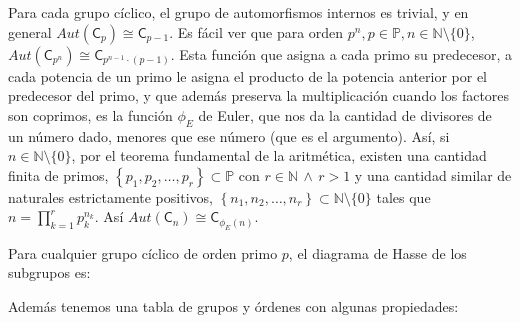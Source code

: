 \documentclass[12pt,a4paper,fleqn,spanish,final,openright]{extbook}
\theoremstyle{definition}
\theoremstyle{remark}
\begin{document}
Para cada grupo cíclico, el grupo de automorfismos internos es trivial, 
y en general $Aut(\mathsf{C}_p)   \cong    \mathsf{C}_{p-1}$. Es fácil ver que 
para orden $p^n , p   \in \mathds{P} , n   \in \mathds{N}\setminus\{0\}$, 
$Aut(\mathsf{C}_{p^n})   \cong    \mathsf{C}_{p^{n-1}    \cdot (p-1)}$. 
Esta función que asigna a cada primo su predecesor, a cada potencia de un primo 
le asigna el producto de la potencia anterior por el predecesor del primo, y que 
además preserva la multiplicación cuando los factores son coprimos, es la función 
$\phi_{E}$ de Euler, que nos da la cantidad de divisores de un número dado, 
menores que ese número (que es el argumento). Así, si 
$n \in \mathds{N}\setminus\{0\}$, por el teorema fundamental de la aritmética, 
existen una cantidad finita de primos, 
$\left\lbrace p_1 , p_2 , \ldots , p_r \right\rbrace    \subset \mathds{P}$ con 
$r   \in \mathds{N}\,   \wedge   \, r>1$ y una cantidad similar de naturales 
estrictamente positivos, $\left\lbrace n_1, n_2 , \ldots , n_r \right\rbrace 
\subset \mathds{N}\setminus\{0\}$ tales que $n = {\prod}_{k=1}^{r} p_k^{n_k}$. 
Así $Aut(\mathsf{C}_n)   \cong    \mathsf{C}_{{\phi_E}(n)}$.

Para cualquier grupo cíclico de orden primo $p$, el diagrama de Hasse de 
los subgrupos es:

\begin{center}
\end{center}

Además tenemos una tabla de grupos y órdenes con algunas propiedades:
\end{document}
